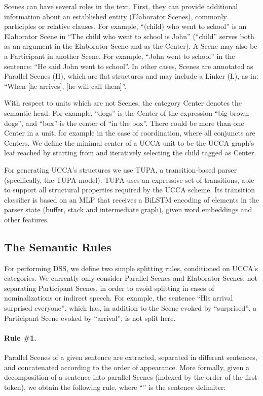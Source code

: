 \documentclass[11pt,a4paper]{article}
\begin{document}
Scenes can have several roles in the text. First, they can provide additional information about an established entity 
(Elaborator Scenes), commonly participles or relative clauses. For example, ``(child) who went to school'' is an Elaborator Scene 
in ``The child who went to school is John'' (``child'' serves both as an argument in the Elaborator Scene and as the Center). 
A Scene may also be a Participant in another Scene. For example, ``John went to school'' in the sentence: ``He said John went to school''. 
In other cases, Scenes are annotated as Parallel Scenes (H), which are flat structures and may include a Linker (L), 
as in:  ``When [he arrives], [he will call them]''.

With respect to units which are not Scenes, the category Center denotes the semantic head. For example, ``dogs'' is the 
Center of the expression ``big brown dogs'', and ``box'' is the center of ``in the box''. There could be more than one 
Center in a unit, for example in the case of coordination, where all conjuncts are Centers. We define the minimal center of a 
UCCA unit  to be the UCCA graph's leaf reached by starting from  and iteratively selecting the child tagged as Center.

For generating UCCA's structures we use TUPA, a transition-based parser
\citep{H17} (specifically, the TUPA model). TUPA uses an
expressive set of transitions, able to support all structural properties
required by the UCCA scheme. Its transition classifier is based on an MLP
that receives a BiLSTM encoding of elements in the parser state (buffer,
stack and intermediate graph), given word embeddings and other features.

\vspace{-0.1cm}
\subsection{The Semantic Rules} \label{sec:rules}

For performing DSS, we define two simple splitting rules, conditioned on UCCA's categories.
We currently only consider Parallel Scenes and Elaborator Scenes, not 
separating Participant Scenes, in order to avoid splitting in cases of nominalizations or indirect speech.
For example, the sentence ``His arrival surprised everyone'', which has, in addition to the Scene evoked by ``surprised'', a Participant Scene evoked by ``arrival'', is not split here.

\paragraph{Rule \#1.}
Parallel Scenes of a given sentence are extracted, separated in different sentences, 
and concatenated according to the order of appearance. More formally, given a 
decomposition of a sentence  into parallel Scenes  
(indexed by the order of the first token), we obtain the following rule, 
where ``'' is the sentence delimiter:
\vspace{-0.6cm}
\end{document}
